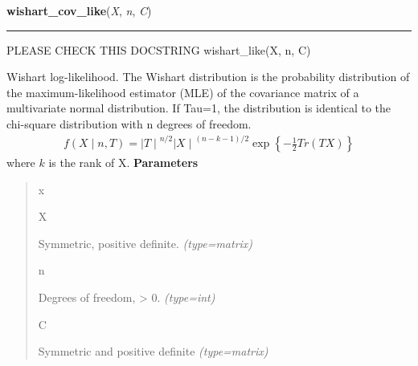     \label{pymc:distributions:wishart_cov_like}

    \vspace{0.5ex}

\hspace{.8\funcindent}\begin{boxedminipage}{\funcwidth}

    \raggedright \textbf{wishart\_cov\_like}(\textit{X}, \textit{n}, \textit{C})

    \vspace{-1.5ex}

    \rule{\textwidth}{0.5\fboxrule}
\setlength{\parskip}{2ex}

PLEASE CHECK THIS DOCSTRING
wishart{\_}like(X, n, C)

Wishart log-likelihood. The Wishart distribution is the probability
distribution of the maximum-likelihood estimator (MLE) of the covariance
matrix of a multivariate normal distribution. If Tau=1, the distribution
is identical to the chi-square distribution with n degrees of freedom.
\begin{equation*}\begin{split}f(X \mid n, T) = {\mid T \mid}^{n/2}{\mid X \mid}^{(n-k-1)/2} \exp\left\{ -\frac{1}{2} Tr(TX) \right\}\end{split}\end{equation*}
where $k$ is the rank of X.
\setlength{\parskip}{1ex}
      \textbf{Parameters}
      \vspace{-1ex}

      \begin{quote}
        \begin{Ventry}{x}

          \item[X]


Symmetric, positive definite.
            {\it (type=matrix)}

          \item[n]


Degrees of freedom, {\textgreater} 0.
            {\it (type=int)}

          \item[C]


Symmetric and positive definite
            {\it (type=matrix)}

        \end{Ventry}

      \end{quote}

    \end{boxedminipage}

